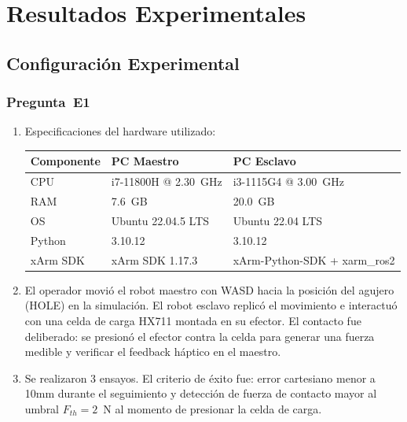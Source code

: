 \documentclass[journal,10pt,twoside]{IEEEtran}
\begin{document}
\section{Resultados Experimentales}
\label{sec:experiments}

\subsection{Configuración Experimental}

\subsubsection*{Pregunta~E1}

\begin{enumerate}[label=(\alph*)]

\item Especificaciones del hardware utilizado:

\begin{center}
\scriptsize
\setlength{\tabcolsep}{4pt}
\renewcommand{\arraystretch}{1.0}
\begin{tabular}{lll}
  \toprule
  \textbf{Componente} & \textbf{PC Maestro} & \textbf{PC Esclavo} \\
  \midrule
  CPU      & i7-11800H @ 2.30~GHz & i3-1115G4 @ 3.00~GHz \\
  RAM      & 7.6~GB               & 20.0~GB \\
  OS       & Ubuntu 22.04.5 LTS   & Ubuntu 22.04 LTS \\
  Python   & 3.10.12              & 3.10.12 \\
  xArm SDK & xArm SDK 1.17.3      & xArm-Python-SDK + xarm\_ros2 \\
  \bottomrule
\end{tabular}
\end{center}

\item El operador movió el robot maestro con WASD hacia la posición
del agujero (HOLE) en la simulación. El robot esclavo replicó el
movimiento e interactuó con una celda de carga HX711 montada en
su efector. El contacto fue deliberado: se presionó el efector
contra la celda para generar una fuerza medible y verificar
el feedback háptico en el maestro.

\item Se realizaron 3 ensayos. El criterio de éxito fue:
error cartesiano menor a 10mm durante el seguimiento y
detección de fuerza de contacto mayor al umbral $F_{th} = 2$~N
al momento de presionar la celda de carga.

\end{enumerate}
\end{document}
